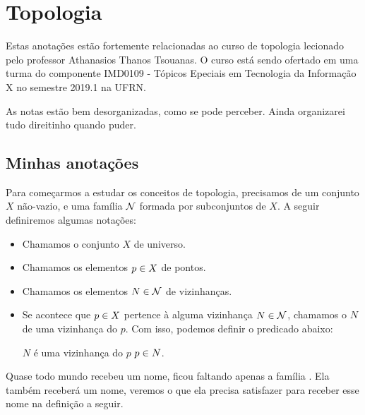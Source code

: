 \documentclass[a4paper,12pt,oneside]{book}
\begin{document}
\frontmatter
\printtitlepage
\tableofcontents

\mainmatter
\chapter{Topologia}
Estas anotações estão fortemente relacionadas ao curso de topologia lecionado pelo professor Athanasios Thanos Tsouanas. O curso está sendo ofertado em uma turma do componente IMD0109 - Tópicos Epeciais em Tecnologia da Informação X no semestre 2019.1 na UFRN.

As notas estão bem desorganizadas, como se pode perceber. Ainda organizarei tudo direitinho quando puder.

\section{Minhas anotações}
Para começarmos a estudar os conceitos de topologia, precisamos de um conjunto $X$ não-vazio, e uma família $\mathcal{N}$ formada por subconjuntos de $X$. A seguir definiremos algumas notações:
\begin{itemize}
	\item Chamamos o conjunto $X$ de universo.
	\item Chamamos os elementos $p \in X$ de pontos.
	\item Chamamos os elementos $N \in \mathcal{N}$ de vizinhanças.
	\item Se acontece que $p \in X$ pertence à alguma vizinhança $N \in \mathcal{N}$, chamamos o $N$ de uma vizinhança do $p$. Com isso, podemos definir o predicado abaixo:
	\begin{center}
		$N$ é uma vizinhança do $p$ \sse $p \in N$.
	\end{center}
\end{itemize}

Quase todo mundo recebeu um nome, ficou faltando apenas a família . Ela também receberá um nome, veremos o que ela precisa satisfazer para receber esse nome na definição a seguir.
\end{document}
